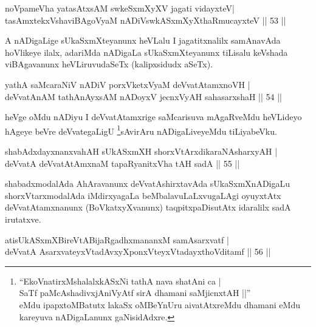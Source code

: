 \begin{shl}
noVpameVha yatasAtxsAM swkeSxmXyXV jagati vidayxteV|\\
tasAmxtekxVshaviBAgoV\s yaM nADiVswkASxmXyXthaRmucayxteV \hfill || 53 || 
\end{shl}

\begin{artha}
A nADigaLige sUkaSxmXteyanunx heVLalu I jagatitxnalilx samAnavAda hoVlikeye ilalx, adariMda nADigaLa sUkaSxmXteyanunx tiLisalu keVshada viBAgavanunx heVLiruvudaSeTx (kalipxsidudx aSeTx).
\end{artha}

\begin{shl}
yathA saMcaraNiV nADiV porxVketxVyaM deVvatAtamxnoVH |\\
deVvatAnAM tathA\s nAyxsAM nADoyxV jecnxVyAH sahasarxshaH \hfill || 54 || 
\end{shl}

\begin{artha}
heVge oMdu nADiyu I deVvatAtamxrige saMcarisuva mAgaRveMdu heVLideyo hAgeye beVre deVvategaLigU \footnote{``EkoVnatirxMshalalxkASxNi tathA nava shatAni ca | \\
SaTf paMcAshadivxjAniVyAtf sirA dhamani saMjicnxtAH ||''\\ eMdu ipapxtoMBatutx lakaSx oMBeYnUru aivatAtxreMdu dhamani eMdu kareyuva nADigaLanunx gaNisidAdxre.}sAvirAru nADigaLiveyeMdu tiLiyabeVku.
\end{artha}


\begin{shl}
shabAdxdayxnanxvahAH sUkASxmXH shorxVtArxdikaraNAsharxyAH |\\
deVvatA deVvatAtAmxnaM tapaRyanitxVha tAH sadA \hfill || 55 || 
\end{shl}

\begin{artha}
shabadxmodalAda AhAravanunx deVvatAshirxtavAda sUkaSxmXnADigaLu shorxVtarxmodalAda iMdirxyagaLa beMbalavuLaLxvugaLAgi oyuyxtAtx deVvatAtamxnanunx (BoVkatxyXvanunx) taqpitxpaDisutAtx idaralilx sadA irutatxve.
\end{artha}

\begin{shl}
atisUkASxmXBireVtABijaRgadhxmananxM samAsarxvatf |\\
deVvatA AsarxvateyxVtadAvxyXponxVteyxVtadayxthoVditamf \hfill || 56 || 
\end{shl}

